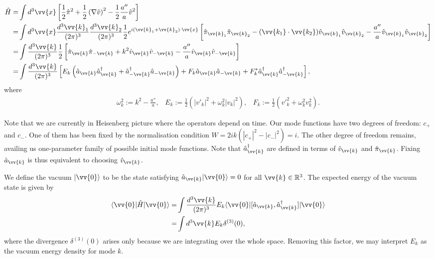 \documentclass[a4paper,12pt,times,custombib,print,index]{Classes/PhDThesisPSnPDF} %
\providecommand{\DIFadd}[1]{{\protect\color{blue}\uwave{#1}}} %
\providecommand{\DIFaddbegin}{} %
\providecommand{\DIFaddend}{} %
\newcommand{\DIFaddincludegraphics}[2][]{{\color{blue}\fbox{\DIFOincludegraphics[#1]{#2}}}} %
\DeclareRobustCommand{\DIFaddbegin}{\DIFOaddbegin \let\includegraphics\DIFaddincludegraphics} %
\DeclareRobustCommand{\DIFaddend}{\DIFOaddend \let\includegraphics\DIFOincludegraphics} %
\begin{document}
\begin{align}
	\hat{H} =& \int d^3 \vv{x} \left[ \frac{1}{2} \hat{\pi}^2 + \frac{1}{2} \left( \nabla \hat{v} \right)^2 - \frac{1}{2}\frac{a''}{a} \hat{v}^2 \right] \label{eqn:single_field_inflation_simple_hammiltonian}\\
	=& \int d^3 \vv{x} \frac{d^3 \vv{k}_1}{(2\pi)^3} \frac{d^3 \vv{k}_2}{(2\pi)^3} \frac{1}{2} e^{i(\vv{k}_1 + \vv{k}_2) \cdot \vv{x}}  \left[ \hat{\pi}_{\vv{k}_1} \hat{\pi}_{\vv{k}_2} - (\vv{k_1} \cdot \vv{k_2}) \hat{v}_{\vv{k}_1} \hat{v}_{\vv{k}_2} - \frac{a''}{a} \hat{v}_{\vv{k}_1} \hat{v}_{\vv{k}_2} \right] \\
	=& \int \frac{d^3 \vv{k}}{(2\pi)^3}  \frac{1}{2} \left[ \hat{\pi}_{\vv{k}} \hat{\pi}_{-\vv{k}} + k^2 \hat{v}_{\vv{k}} \hat{v}_{-\vv{k}} - \frac{a''}{a} \hat{v}_{\vv{k}} \hat{v}_{-\vv{k}} \right] \\
	=&  \int \frac{d^3 \vv{k}}{(2\pi)^3} \left[ E_k \left( \hat{a}_\vv{k} \hat{a}^\dagger_\vv{k} + \hat{a}^\dagger_{-\vv{k}} \hat{a}_{-\vv{k}} \right) + F_k \hat{a}_{\vv{k}} \hat{a}_{-\vv{k}} + F_k^* \hat{a}^\dagger_{\vv{k}} \hat{a}^\dagger_{-\vv{k}}  \right],
\end{align}
where
\begin{align}
	\omega_k^2 := k^2 - \frac{a''}{a}, \;\;\; E_k := \frac{1}{2}(|v'_k|^2 + \omega_k^2 |v_k|^2), \;\;\; F_k := \frac{1}{2}(v'^2_k + \omega_k^2 v^2_k).
\end{align}

Note that we are currently in \DIFaddbegin \DIFadd{the }\DIFaddend Heisenberg picture where the operators depend on time. Our mode functions have two degrees of freedom: $c_+$ and $c_-$. One of them has been fixed by the normalisation condition $W=2ik(|c_+|^2-|c_-|^2)=i$. The other degree of freedom remains, availing us \DIFaddbegin \DIFadd{a }\DIFaddend one-parameter family of possible initial mode functions. Note that $\hat{a}^\dagger_\vv{k}$ are defined in terms of $\hat{v}_\vv{k}$ and $\hat{\pi}_\vv{k}$. Fixing $\hat{a}_\vv{k}$ is thus equivalent to choosing $\hat{v}_\vv{k}$.

We define the vacuum $|\vv{0}\rangle$ to be the state satisfying $\hat{a}_\vv{k} |\vv{0}\rangle = 0$ for all $\vv{k} \in \mathbb{R}^3$. The expected energy of the vacuum state is given by
\begin{align}
	\langle \vv{0} | \hat{H} | \vv{0} \rangle =& \int \frac{d^3\vv{k}}{(2\pi)^3} E_k \langle \vv{0} | [ \hat{a}_\vv{k}, \hat{a}^\dagger_\vv{k} ] | \vv{0} \rangle	\\
	=& \int d^3\vv{k} E_k \delta^{(3)}(0),
\end{align}
where the divergence $\delta^{(3)}(0)$ arises only because we are integrating over the whole space. Removing this factor, we may interpret $E_k$ as the vacuum energy density for mode $k$.
\end{document}
